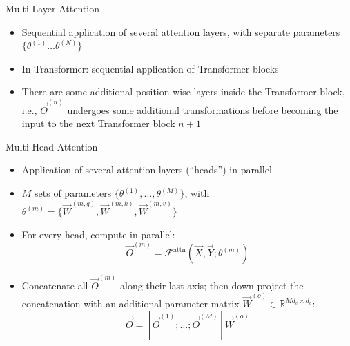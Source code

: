 
\begin{vbframe}{Multi-Layer Attention}

\vfill

\begin{itemize}
\item Sequential application of several attention layers, with separate parameters $\{\theta^{(1)} \ldots \theta^{(N)}\}$ 
\item In Transformer: sequential application of Transformer blocks
\item There are some additional position-wise layers inside the Transformer block, i.e., $\vec O^{(n)}$ undergoes some additional transformations before becoming the input to the next Transformer block $n+1$
\end{itemize}

\vfill

\end{vbframe}


\begin{vbframe}{Multi-Head Attention}

\vfill

\begin{itemize}
\item Application of several attention layers (``heads'') in parallel
\item $M$ sets of parameters $\{\theta^{(1)}, \ldots, \theta^{(M)}\}$, with $\theta^{(m)} = \{\vec {W}^{(m,q)}, \vec {W}^{(m,k)}, \vec {W}^{(m,v)}\}$
\item For every head, compute in parallel:
$$ \vec O^{(m)} = \mathcal{F}^\mathrm{attn}(\vec X, \vec Y; \theta^{(m)}) $$
\item Concatenate all $\vec {O}^{(m)}$ along their last axis; then down-project the concatenation with an additional parameter matrix $\vec W^{(o)} \in \mathbb{R}^{Md_v \times d_v}$:
$$ \vec O = [\vec O^{(1)}; \ldots;  \vec O^{(M)}] \vec W^{(o)}$$
\end{itemize}

\vfill

\end{vbframe}


